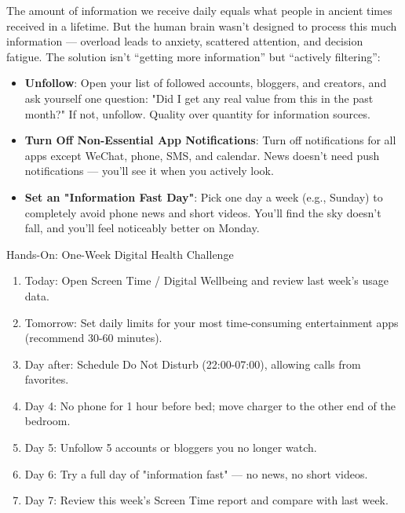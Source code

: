 
The amount of information we receive daily equals what people in ancient times received in a lifetime. But the human brain wasn't designed to process this much information — overload leads to anxiety, scattered attention, and decision fatigue. The solution isn't “getting more information” but “actively filtering”:

\begin{itemize}
  \item \textbf{Unfollow}: Open your list of followed accounts, bloggers, and creators, and ask yourself one question: "Did I get any real value from this in the past month?" If not, unfollow. Quality over quantity for information sources.
  \item \textbf{Turn Off Non-Essential App Notifications}: Turn off notifications for all apps except WeChat, phone, SMS, and calendar. News doesn't need push notifications — you'll see it when you actively look.
  \item \textbf{Set an "Information Fast Day"}: Pick one day a week (e.g., Sunday) to completely avoid phone news and short videos. You'll find the sky doesn't fall, and you'll feel noticeably better on Monday.
\end{itemize}

\begin{tcbpractice}{Hands-On: One-Week Digital Health Challenge}
\begin{enumerate}
  \item Today: Open Screen Time / Digital Wellbeing and review last week's usage data.
  \item Tomorrow: Set daily limits for your most time-consuming entertainment apps (recommend 30-60 minutes).
  \item Day after: Schedule Do Not Disturb (22:00-07:00), allowing calls from favorites.
  \item Day 4: No phone for 1 hour before bed; move charger to the other end of the bedroom.
  \item Day 5: Unfollow 5 accounts or bloggers you no longer watch.
  \item Day 6: Try a full day of "information fast" — no news, no short videos.
  \item Day 7: Review this week's Screen Time report and compare with last week.
\end{enumerate}

\end{tcbpractice}

